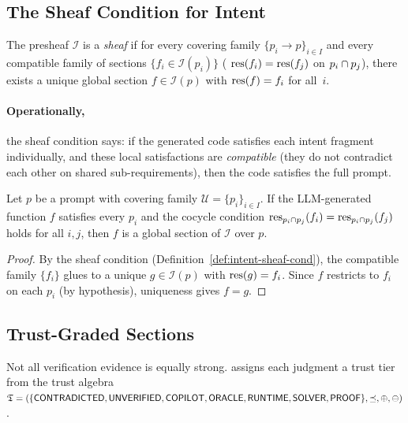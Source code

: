 \documentclass[11pt]{article}
\newcommand{\IntentSheaf}{\mathcal{I}}
\newcommand{\CoverFam}{\mathcal{U}}
\begin{document}
\subsection{The Sheaf Condition for Intent}\label{sec:sheaf-cond}

\begin{definition}\label{def:intent-sheaf-cond}
The presheaf $\IntentSheaf$ is a \emph{sheaf} if for every covering
family $\{p_i \to p\}_{i \in I}$ and every compatible family of
sections $\{f_i \in \IntentSheaf(p_i)\}$ (\ie
$\mathrm{res}(f_i) = \mathrm{res}(f_j)$ on $p_i \cap p_j$), there exists a
unique global section $f \in \IntentSheaf(p)$ with
$\mathrm{res}(f) = f_i$ for all~$i$.
\end{definition}

\paragraph{Operationally,} the sheaf condition says: if the generated
code satisfies each intent fragment individually, and these local
satisfactions are \emph{compatible} (they do not contradict each other
on shared sub-requirements), then the code satisfies the full prompt.

\begin{proposition}\label{prop:cover-complete}
Let $p$ be a prompt with covering family
$\CoverFam = \{p_i\}_{i \in I}$.  If the LLM-generated function $f$
satisfies every $p_i$ and the cocycle condition
$\mathrm{res}_{p_i \cap p_j}(f_i) = \mathrm{res}_{p_i \cap p_j}(f_j)$ holds for all
$i, j$, then $f$ is a global section of $\IntentSheaf$ over $p$.
\end{proposition}

\begin{proof}
By the sheaf condition (Definition~\ref{def:intent-sheaf-cond}), the
compatible family $\{f_i\}$ glues to a unique $g \in \IntentSheaf(p)$
with $\mathrm{res}(g) = f_i$.  Since $f$ restricts to $f_i$ on each $p_i$
(by hypothesis), uniqueness gives $f = g$.
\end{proof}

\subsection{Trust-Graded Sections}\label{sec:trust-graded}

Not all verification evidence is equally strong.  \JuGeo{} assigns
each judgment a trust tier from the trust algebra
$\mathfrak{T} = (\{\mathsf{CONTRADICTED}, \mathsf{UNVERIFIED}, \mathsf{COPILOT}, \mathsf{ORACLE}, \mathsf{RUNTIME},
\mathsf{SOLVER}, \mathsf{PROOF}\}, \preceq, \oplus, \ominus)$.
\end{document}
